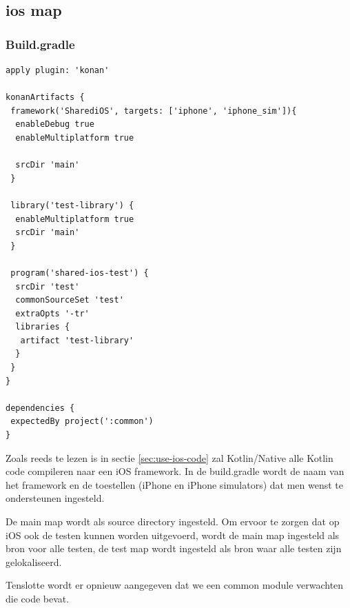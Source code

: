 \subsection{ios map}
\subsubsection{Build.gradle}
\label{sec:ios-build-gradle}
\begin{lstlisting}
apply plugin: 'konan'

konanArtifacts {
 framework('SharediOS', targets: ['iphone', 'iphone_sim']){
  enableDebug true
  enableMultiplatform true

  srcDir 'main'
 }

 library('test-library') {
  enableMultiplatform true
  srcDir 'main'
 }

 program('shared-ios-test') {
  srcDir 'test'
  commonSourceSet 'test'
  extraOpts '-tr'
  libraries {
   artifact 'test-library'
  }
 }
}

dependencies {
 expectedBy project(':common')
}
\end{lstlisting}

Zoals reeds te lezen is in sectie \ref{sec:use-ios-code} zal Kotlin/Native alle Kotlin code compileren naar een iOS framework. In de build.gradle wordt de naam van het framework en de toestellen (iPhone en iPhone simulators) dat men wenst te ondersteunen ingesteld.

De main map wordt als source directory ingesteld. Om ervoor te zorgen dat op iOS ook de testen kunnen worden uitgevoerd, wordt de main map ingesteld als bron voor alle testen, de test map wordt ingesteld als bron waar alle testen zijn gelokaliseerd.

Tenslotte wordt er opnieuw aangegeven dat we een common module verwachten die code bevat.

